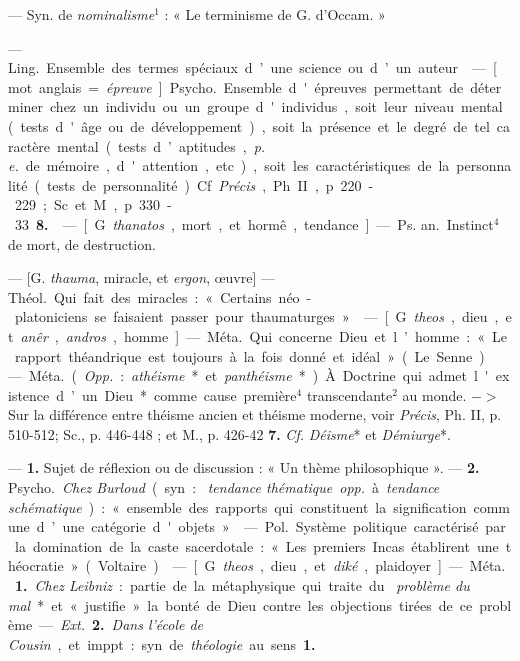 \begin{itemize}[leftmargin=1cm, label=, itemsep=1pt]
 — Syn. de {\it nominalisme}$^1$ : « Le terminisme de G.
d’Occam. »

 — \si{Ling.} Ensemble des termes spéciaux d’une science ou
d’un auteur.

 — [mot anglais = {\it épreuve}] \si{Psycho.} Ensemble d'épreuves
permettant de déterminer chez un individu ou un groupe d'individus, soit leur
niveau mental (tests d'âge ou de développement), soit la présence et le degré
de tel caractère mental (tests d’aptitudes, {\it p. e.} de mémoire,
d'attention, etc.), soit les caractéristiques de la personnalité (tests de
personnalité). Cf. {\it Précis}, Ph. II, p. 220-229; Sc. et M., p. 330-33
{\bf 8.}

 — [G. {\it thanatos}, mort, et hormê, tendance] —
\si{Ps. an.} Instinct$^4$ de mort, de destruction.

 — [G. {\it thauma}, miracle, et {\it ergon}, œuvre] —
\si{Théol.} Qui fait des miracles : « Certains néo-platoniciens se faisaient
passer pour thaumaturges. »

 — [G. {\it theos}, dieu, et {\it anêr}, {\it andros}, homme]
— \si{Méta.} Qui concerne Dieu et l’homme : « Le rapport théandrique est
toujours à la fois donné et idéal » (Le Senne).

 — \si{Méta.} ({\it Opp.} : {\it athéisme}* et
{\it panthéisme}*). À. Doctrine qui admet l'existence d’un Dieu* comme cause
première$^4$ transcendante$^2$ au monde. $->$ Sur la différence entre théisme
ancien et théisme moderne, voir
{\it Précis}, Ph. II, p. 510-512; Sc., p. 446-448 ; et M., p. 426-42 {\bf 7.}
{\it Cf.} {\it Déisme}* et {\it Démiurge}*.

 — {\bf 1.} Sujet de réflexion ou de discussion : « Un thème
philosophique ». — {\bf 2.} \si{Psycho.} {\it Chez Burloud} (syn. : {\it
tendance thématique} {\it opp.} à {\it tendance schématique}) : « ensemble
des rapports qui constituent la signification commune d’une catégorie
d'objets. »

 — \si{Pol.} Système politique caractérisé par la domination
de la caste sacerdotale : « Les premiers Incas établirent une théocratie
» (Voltaire).

 — [G. {\it theos}, dieu, et {\it diké}, plaidoyer] — \si{Méta.}
{\bf 1.} {\it Chez Leibniz} : partie de la métaphysique qui traite du {\it
problème du mal}* et « justifie » la bonté de Dieu contre les objections
tirées de ce problème. — {\it Ext.} {\bf 2.} {\it Dans l'école de Cousin}, et
imppt : syn. de {\it théologie} au sens {\bf 1.}


\end{itemize}
